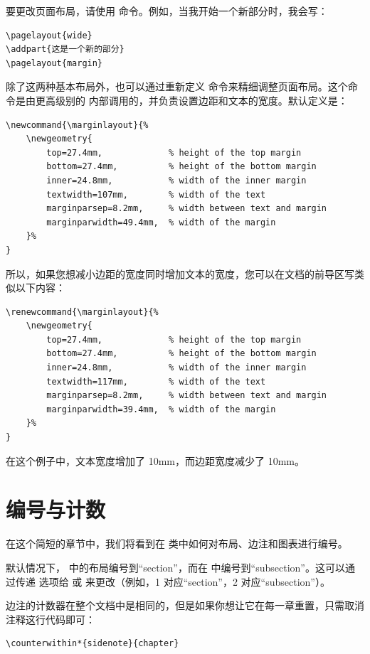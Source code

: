 要更改页面布局，请使用  命令。例如，当我开始一个新部分时，我会写：

\begin{lstlisting}
\pagelayout{wide}
\addpart{这是一个新的部分}
\pagelayout{margin}
\end{lstlisting}

除了这两种基本布局外，也可以通过重新定义  命令来精细调整页面布局。这个命令是由更高级别的  内部调用的，并负责设置边距和文本的宽度。默认定义是：

\begin{lstlisting}
\newcommand{\marginlayout}{%
	\newgeometry{
		top=27.4mm,				% height of the top margin
		bottom=27.4mm,			% height of the bottom margin
		inner=24.8mm,			% width of the inner margin
		textwidth=107mm,		% width of the text
		marginparsep=8.2mm,		% width between text and margin
		marginparwidth=49.4mm,	% width of the margin
	}%
}
\end{lstlisting}

所以，如果您想减小边距的宽度同时增加文本的宽度，您可以在文档的前导区写类似以下内容：

\begin{lstlisting}
\renewcommand{\marginlayout}{%
	\newgeometry{
		top=27.4mm,				% height of the top margin
		bottom=27.4mm,			% height of the bottom margin
		inner=24.8mm,			% width of the inner margin
		textwidth=117mm,		% width of the text
		marginparsep=8.2mm,		% width between text and margin
		marginparwidth=39.4mm,	% width of the margin
	}%
}
\end{lstlisting}

在这个例子中，文本宽度增加了 10mm，而边距宽度减少了 10mm。

\section{编号与计数}

在这个简短的章节中，我们将看到在  类中如何对布局、边注和图表进行编号。

默认情况下， 中的布局编号到“section”，而在  中编号到“subsection”。这可以通过传递  选项给  或  来更改（例如，1 对应“section”，2 对应“subsection”）。

边注的计数器在整个文档中是相同的，但是如果你想让它在每一章重置，只需取消注释这行代码即可：

\begin{lstlisting}[style=kaolstplain]
\counterwithin*{sidenote}{chapter}
\end{lstlisting}

